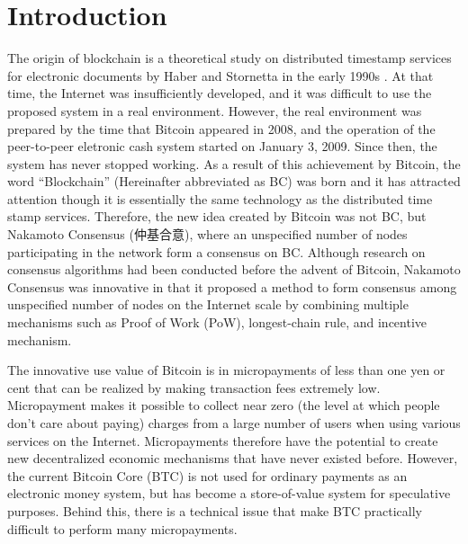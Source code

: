 \documentclass[graybox]{svmult}
\begin{document}
\section{Introduction}
\label{sec:intro}
The origin of blockchain is a theoretical study on distributed timestamp services for electronic documents by Haber and Stornetta in the early 1990s
\cite{HS1991,BHS1993,HS1997}.
At that time, the Internet was insufficiently developed, and it was difficult to use the proposed system in a real environment.
However, the real environment was prepared by the time that Bitcoin \cite{nakamoto} appeared in 2008, and the operation of the peer-to-peer eletronic cash system started on January 3, 2009.
Since then, the system has never stopped working. 
As a result of this achievement by Bitcoin, the word ``Blockchain'' (Hereinafter abbreviated as BC) was born and it has attracted attention though it is essentially the same technology as the distributed time stamp services.
Therefore, the new idea created by Bitcoin was not BC, but Nakamoto Consensus (仲基合意), where an unspecified number of nodes participating in the network form a consensus on BC. 
Although research on consensus algorithms had been conducted before the advent of Bitcoin, Nakamoto Consensus was innovative in that it proposed a method to form consensus among unspecified number of nodes on the Internet scale by combining multiple mechanisms such as Proof of Work (PoW)\cite{DN1993,JJ1999}, longest-chain rule, and incentive mechanism.


The innovative use value of Bitcoin is in micropayments of less than one yen or cent that can be realized by making transaction fees extremely low. 
Micropayment makes it possible to collect near zero (the level at which people don't care about paying) charges from a large number of users when using various services on the Internet.
Micropayments therefore have the potential to create new decentralized economic mechanisms that have never existed before.
However, the current Bitcoin Core (BTC) \cite{btc} is not used for ordinary payments as an electronic money system, but has become a store-of-value system for speculative purposes. 
Behind this, there is a technical issue that make BTC practically difficult to perform many micropayments. 
\end{document}
